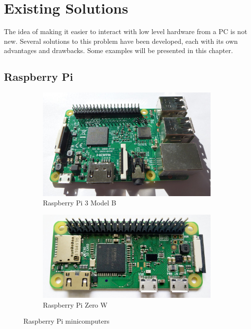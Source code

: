 \chapter{\label{sec:prior-art}Existing Solutions}

The idea of making it easier to interact with low level hardware from a \gls{PC} is not new. Several solutions to this problem have been developed, each with its own advantages and drawbacks. Some examples will be presented in this chapter.

\section{Raspberry Pi}

\begin{figure}[H]
	\centering
	\begin{subfigure}{.5\textwidth}
		\centering
		\includegraphics[width=.95\textwidth] {img/pi3-photo.jpg}
		\caption{Raspberry Pi 3 Model B}
	\end{subfigure}%
	\begin{subfigure}{.5\textwidth}
		\centering
		\includegraphics[width=.95\textwidth] {img/pi0.jpg}
		\caption{Raspberry Pi Zero W}
	\end{subfigure}
	\caption{\label{fig:rpi}Raspberry Pi minicomputers}
\end{figure}

